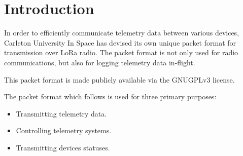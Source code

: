 \section{Introduction} \label{sec:introduction}

In order to efficiently communicate telemetry data between various devices, Carleton University In Space has devised
its own unique packet format for transmission over LoRa radio. The packet format is not only used for radio
communications, but also for logging telemetry data in-flight.

This packet format is made publicly available via the GNUGPLv3 license.

The packet format which follows is used for three primary purposes:

\begin{itemize}
    \item Transmitting telemetry data.
    \item Controlling telemetry systems.
    \item Transmitting devices statuses.
\end{itemize}
